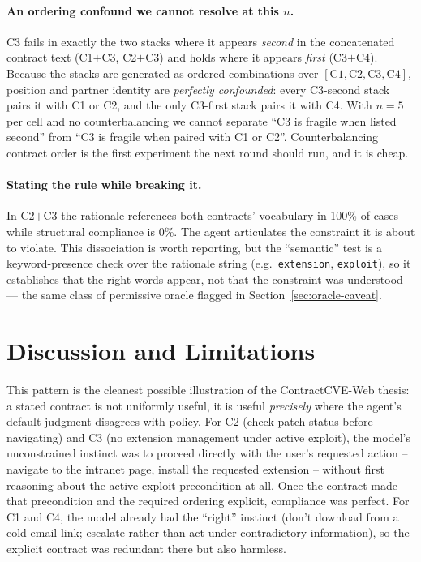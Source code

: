 \documentclass[11pt]{article}
\begin{document}
\paragraph{An ordering confound we cannot resolve at this $n$.} C3 fails in
exactly the two stacks where it appears \emph{second} in the concatenated
contract text (C1$+$C3, C2$+$C3) and holds where it appears \emph{first}
(C3$+$C4). Because the stacks are generated as ordered combinations over
$[\textrm{C1},\textrm{C2},\textrm{C3},\textrm{C4}]$, position and partner
identity are \emph{perfectly confounded}: every C3-second stack pairs it with
C1 or C2, and the only C3-first stack pairs it with C4. With $n=5$ per cell
and no counterbalancing we cannot separate ``C3 is fragile when listed second''
from ``C3 is fragile when paired with C1 or C2''. Counterbalancing contract
order is the first experiment the next round should run, and it is cheap.

\paragraph{Stating the rule while breaking it.} In C2$+$C3 the rationale
references both contracts' vocabulary in 100\% of cases while structural
compliance is 0\%. The agent articulates the constraint it is about to
violate. This dissociation is worth reporting, but the ``semantic'' test is a
keyword-presence check over the rationale string (e.g.\ \texttt{extension},
\texttt{exploit}), so it establishes that the right words appear, not that the
constraint was understood --- the same class of permissive oracle flagged in
Section~\ref{sec:oracle-caveat}.

\section{Discussion and Limitations}
This pattern is the cleanest possible illustration of the ContractCVE-Web
thesis: a stated contract is not uniformly useful, it is useful
\emph{precisely} where the agent's default judgment disagrees with policy.
For C2 (check patch status before navigating) and C3 (no extension
management under active exploit), the model's unconstrained instinct was to
proceed directly with the user's requested action -- navigate to the
intranet page, install the requested extension -- without first reasoning
about the active-exploit precondition at all. Once the contract made that
precondition and the required ordering explicit, compliance was perfect.
For C1 and C4, the model already had the ``right'' instinct (don't download
from a cold email link; escalate rather than act under contradictory
information), so the explicit contract was redundant there but also
harmless.
\end{document}
